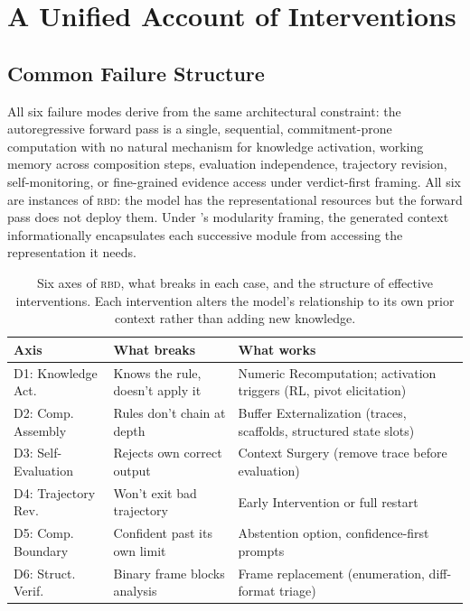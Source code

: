\documentclass[11pt]{article}
\newcommand{\rbd}{\textsc{rbd}}
\newcommand{\tighttable}{\setlength{\tabcolsep}{4pt}\renewcommand{\arraystretch}{1.05}}
\begin{document}
\section{A Unified Account of Interventions}
\label{sec:unified}

\subsection{Common Failure Structure}

All six failure modes derive from the same architectural constraint: the
autoregressive forward pass is a single, sequential, commitment-prone
computation with no natural mechanism for knowledge activation, working
memory across composition steps, evaluation independence, trajectory
revision, self-monitoring, or fine-grained evidence access under
verdict-first framing. All six are instances of \rbd{}: the model has
the representational resources but the forward pass does not deploy
them. Under \citet{fodor1983modularity}'s modularity framing, the
generated context informationally encapsulates each successive module
from accessing the representation it needs.

\begin{table}[H]
\centering\small\tighttable
\begin{tabular}{p{2.8cm}p{2.5cm}p{3.5cm}}
\toprule
\textbf{Axis} & \textbf{What breaks} & \textbf{What works} \\
\midrule
D1: Knowledge Act. & Knows the rule, doesn't apply it & Numeric Recomputation; activation triggers (RL, pivot elicitation) \\
D2: Comp. Assembly & Rules don't chain at depth & Buffer Externalization (traces, scaffolds, structured state slots) \\
D3: Self-Evaluation & Rejects own correct output & Context Surgery (remove trace before evaluation) \\
D4: Trajectory Rev. & Won't exit bad trajectory & Early Intervention or full restart \\
D5: Comp. Boundary & Confident past its own limit & Abstention option, confidence-first prompts \\
D6: Struct. Verif. & Binary frame blocks analysis & Frame replacement (enumeration, diff-format triage) \\
\bottomrule
\end{tabular}
\caption{Six axes of \rbd{}, what breaks in each case, and the structure
of effective interventions. Each intervention alters the model's
relationship to its own prior context rather than adding new knowledge.}
\label{tab:interventions}
\end{table}
\end{document}
